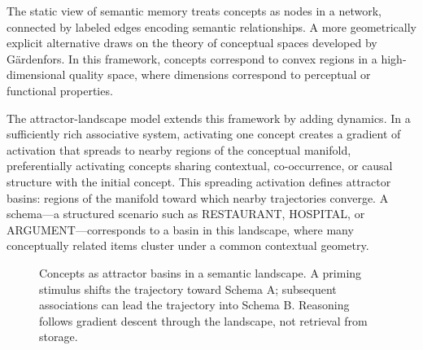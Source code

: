 \documentclass[11pt, a4paper]{article}
\theoremstyle{plain}
\theoremstyle{definition}
\theoremstyle{remark}
\begin{document}
The static view of semantic memory treats concepts as nodes in a network, connected by
labeled edges encoding semantic relationships. A more geometrically explicit alternative
draws on the theory of conceptual spaces developed by Gärdenfors. In this framework,
concepts correspond to convex regions in a high-dimensional quality space, where
dimensions correspond to perceptual or functional properties.

The attractor-landscape model extends this framework by adding dynamics. In a
sufficiently rich associative system, activating one concept creates a gradient of
activation that spreads to nearby regions of the conceptual manifold, preferentially
activating concepts sharing contextual, co-occurrence, or causal structure with the
initial concept. This spreading activation defines attractor basins: regions of the
manifold toward which nearby trajectories converge. A schema---a structured scenario
such as RESTAURANT, HOSPITAL, or ARGUMENT---corresponds to a basin in this landscape,
where many conceptually related items cluster under a common contextual geometry.

\begin{figure}[h]
\centering
{}
\caption{Concepts as attractor basins in a semantic landscape. A priming stimulus
shifts the trajectory toward Schema A; subsequent associations can lead the trajectory
into Schema B. Reasoning follows gradient descent through the landscape, not
retrieval from storage.}
\end{figure}
\end{document}

